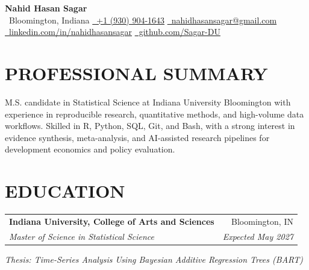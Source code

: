 \documentclass[10pt,letterpaper]{article}
\makeatletter
\newcommand{\resumeEntry}[4]{%
  \begin{tabularx}{\textwidth}{@{}Xr@{}}
    \textbf{#1} & #2 \\
    \textit{#3} & \textit{#4}
  \end{tabularx}%
}
\newcommand{\contactsep}{\qquad}
\makeatother
\begin{document}
\normalsize

\begin{center}
  {\LARGE
   \textbf{Nahid Hasan Sagar}}\\[2.2pt]

  {\footnotesize
    \faMapMarker*\, Bloomington, Indiana
    \contactsep
    \href{tel:+19309041643}{\faPhone*\, +1 (930) 904-1643}
    \contactsep
    \href{mailto:nahidhasansagar@gmail.com}{\faEnvelope\, nahidhasansagar@gmail.com}
  }\\[-0.2pt]

  {\footnotesize
    \href{https://www.linkedin.com/in/nahidhasansagar/}{\faLinkedinIn\, linkedin.com/in/nahidhasansagar}
    \contactsep
    \href{https://github.com/Sagar-DU}{\faGithub\, github.com/Sagar-DU}
  }
\end{center}

\vspace{-5pt}

\section*{PROFESSIONAL SUMMARY}

M.S. candidate in Statistical Science at Indiana University Bloomington with experience in reproducible research, quantitative methods, and high-volume data workflows. Skilled in R, Python, SQL, Git, and Bash, with a strong interest in evidence synthesis, meta-analysis, and AI-assisted research pipelines for development economics and policy evaluation.

\section*{EDUCATION}

\resumeEntry
  {Indiana University, College of Arts and Sciences}
  {Bloomington, IN}
  {Master of Science in Statistical Science}
  {Expected May 2027}

\vspace{0.4pt}

\textit{Thesis: Time-Series Analysis Using Bayesian Additive Regression Trees (BART)}
\end{document}
